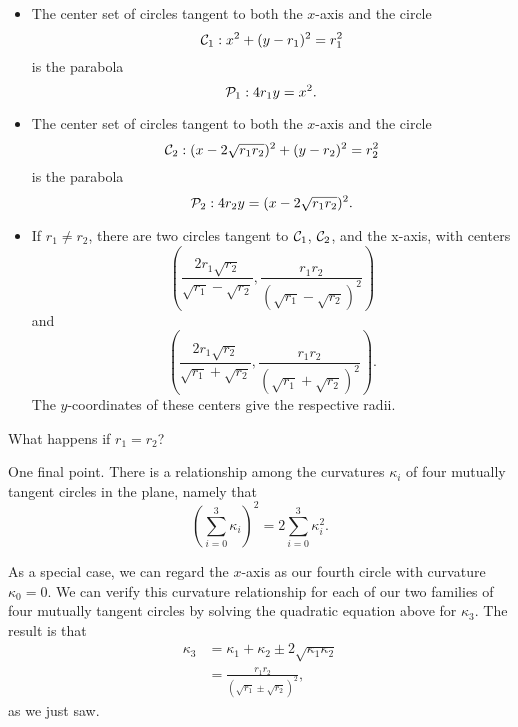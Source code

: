 \documentclass{ximera}
\newcommand{\pskip}{\vskip 0.1 in}
\begin{document}
\begin{itemize}
\item{The center set of circles tangent to both the $x$-axis and the circle
\[
     {\cal C}_1: x^2 + (y-r_1)^2 = r_1^2
\] 
is the parabola
\[
    {\cal P}_1: 4r_1 y = x^2 .
\]
}

\item{The center set of circles tangent to both the $x$-axis and the circle
\[
     {\cal C}_2: (x-2\sqrt{r_1r_2})^2 + (y-r_2)^2 = r_2^2
\] 
is the parabola
\[
    {\cal P}_2: 4r_2 y = (x-2\sqrt{r_1r_2})^2 .
\]
}

\item{If $r_1\neq r_2$, there are two circles tangent to ${\cal C}_1$, ${\cal C}_2$, and the x-axis, with centers
\[
      \left( \frac{2r_1\sqrt{r_2}}{\sqrt{r_1} -\sqrt{r_2}} , \frac{r_1 r_2}{(\sqrt{r_1} -\sqrt{r_2})^2}  \right) 
\]
and
\[
      \left( \frac{2r_1\sqrt{r_2}}{\sqrt{r_1} +\sqrt{r_2}} , \frac{r_1 r_2}{(\sqrt{r_1} +\sqrt{r_2})^2}  \right) .
\]
The $y$-coordinates of these centers give the respective radii.
}
\end{itemize}


\begin{question} \label{Q43ttgt:Spheres}
What happens if $r_1=r_2$?
\end{question}

One final point. There is a relationship among the curvatures $\kappa_i$ of four mutually tangent circles in the plane, namely that
\[
    \left( \sum_{i=0}^3 \kappa_i \right)^2 = 2 \sum_{i=0}^3 \kappa_i^2 .     \label{Eq:Q1TangentSpheres}
\]






As a special case, we can regard the $x$-axis as our fourth circle with curvature $\kappa_0 = 0$. We can verify this curvature relationship for each of our two families of four mutually tangent circles by solving the quadratic equation above for $\kappa_3$. The result is that
\begin{align*}
   \kappa_3   &= \kappa_1 + \kappa_2 \pm 2\sqrt{\kappa_1\kappa_2}  \\
                   &= \frac{r_1 r_2}{(\sqrt{r_1} \pm\sqrt{r_2})^2} ,
\end{align*}
as we just saw.
\end{document}
